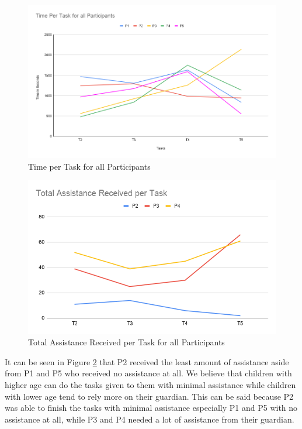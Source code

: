 \begin{figure}[H]
    \centering
    \includegraphics[width=15cm]{figures/Results/allParticipants.png}
    \caption{Time per Task for all Participants}
    \label{fig:alltime}
\end{figure}

\begin{figure}[H]
    \centering
    \includegraphics[width=15cm]{figures/Results/allAssistance.png}
    \caption{Total Assistance Received per Task for all Participants}
    \label{fig:allassistance}
\end{figure}

It can be seen in Figure \ref{fig:allassistance} that P2 received the least amount of assistance aside from P1 and P5 who received no assistance at all. We believe that children with higher age can do the tasks given to them with minimal assistance while children with lower age tend to rely more on their guardian. This can be said because P2 was able to finish the tasks with minimal assistance especially P1 and P5 with no assistance at all, while P3 and P4 needed a lot of assistance from their guardian. 

